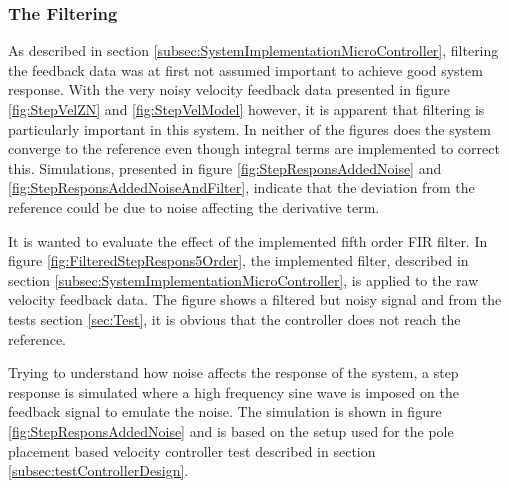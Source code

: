 \documentclass[../../main.tex]{subfiles}
\begin{document}

\subsubsection*{The Filtering} \label{subsec:TheFiltering}
As described in section \ref{subsec:SystemImplementationMicroController}, filtering the feedback data was at first not assumed important to achieve good system response. With the very noisy velocity feedback data presented in figure \ref{fig:StepVelZN} and \ref{fig:StepVelModel} however, it is apparent that filtering is particularly important in this system. In neither of the figures does the system converge to the reference even though integral terms are implemented to correct this. Simulations, presented in figure \ref{fig:StepResponsAddedNoise} and \ref{fig:StepResponsAddedNoiseAndFilter}, indicate that the deviation from the reference could be due to noise affecting the derivative term.

It is wanted to evaluate the effect of the implemented fifth order FIR filter. In figure \ref{fig:FilteredStepRespons5Order}, the implemented filter, described in section \ref{subsec:SystemImplementationMicroController}, is applied to the raw velocity feedback data. The figure shows a filtered but noisy signal and from the tests section \ref{sec:Test}, it is obvious that the controller does not reach the reference.


Trying to understand how noise affects the response of the system, a step response is simulated where a high frequency sine wave is imposed on the feedback signal to emulate the noise. The simulation is shown in figure \ref{fig:StepResponsAddedNoise} and is based on the setup used for the pole placement based velocity controller test described in section \ref{subsec:testControllerDesign}.
\end{document}
